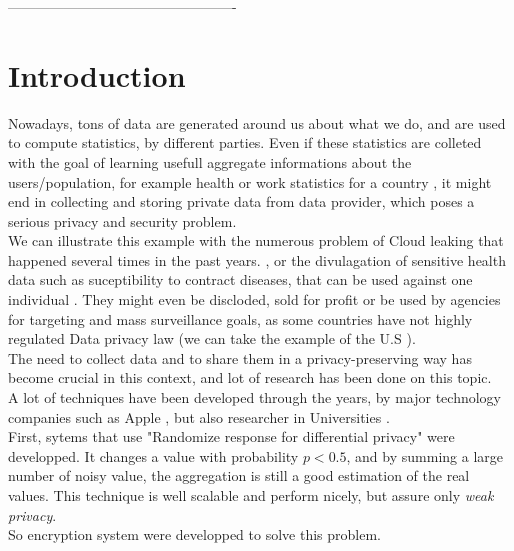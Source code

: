 \documentclass{article}
\begin{document}
-------------------------------------------------

\newpage
\tableofcontents
\newpage



\section*{Introduction}
Nowadays, tons of data are generated around us about what we do, and are used to compute statistics, by different parties. Even if these statistics are colleted with the goal of learning usefull aggregate informations about the users/population, for example health or work statistics for a country \cite{swiss}, it might end in collecting and storing private data from data provider, which poses a serious privacy and security problem.\\
We can illustrate this example with the numerous problem of Cloud leaking that happened several times in the past years. \cite{pentagon}, or the divulagation of sensitive health data such as suceptibility to contract diseases, that can be used against one individual \cite{sell}. They might even be discloded, sold for profit \cite{sold} or be used by agencies for targeting and mass surveillance goals, as some countries have not highly regulated Data privacy law (we can take the example of the U.S \cite{law}).\\
The need to collect data and to share them in a privacy-preserving way has become crucial in this context, and lot of research has been done on this topic.\\
A lot of techniques have been developed through the years, by major technology companies such as Apple \cite{apple}, but also researcher in Universities \cite{unlynx,prio}.\\
First, sytems that use "Randomize response for differential privacy" \cite{randomized} were developped. It changes a value with probability $p < 0.5$, and by summing a large number of noisy value, the aggregation is still a good estimation of the real values. This technique is well scalable and perform nicely, but assure only \textit{weak privacy}.\\
So encryption system were developped to solve this problem.
\end{document}
